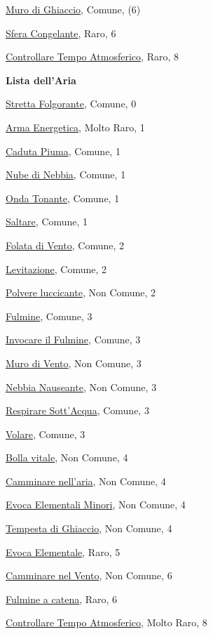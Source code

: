 \begin{multicols}{3}
{{\hyperlink{Muro di Ghiaccio}{Muro di Ghiaccio}, Comune, (6)

\hyperlink{Sfera Congelante}{Sfera Congelante}, Raro, 6

\hyperlink{Controllare Tempo Atmosferico}{Controllare Tempo Atmosferico}, Raro, 8

\medskip\textbf{Lista dell'Aria}

\hyperlink{Stretta Folgorante}{Stretta Folgorante}, Comune, 0

\hyperlink{Arma Energetica}{Arma Energetica}, Molto Raro, 1

\hyperlink{Caduta Piuma}{Caduta Piuma}, Comune, 1

\hyperlink{Nube di Nebbia}{Nube di Nebbia}, Comune, 1

\hyperlink{Onda Tonante}{Onda Tonante}, Comune, 1

\hyperlink{Saltare}{Saltare}, Comune, 1

\hyperlink{Folata di Vento}{Folata di Vento}, Comune, 2

\hyperlink{Levitazione}{Levitazione}, Comune, 2

\hyperlink{Polvere luccicante}{Polvere luccicante}, Non Comune, 2

\hyperlink{Fulmine}{Fulmine}, Comune, 3

\hyperlink{Invocare il Fulmine}{Invocare il Fulmine}, Comune, 3

\hyperlink{Muro di Vento}{Muro di Vento}, Non Comune, 3

\hyperlink{Nebbia Nauseante}{Nebbia Nauseante}, Non Comune, 3

\hyperlink{Respirare Sott'Acqua}{Respirare Sott'Acqua}, Comune, 3

\hyperlink{Volare}{Volare}, Comune, 3

\hyperlink{Bolla vitale}{Bolla vitale}, Non Comune, 4

\hyperlink{Camminare nell'aria}{Camminare nell'aria}, Non Comune, 4

\hyperlink{Evoca Elementali Minori}{Evoca Elementali Minori}, Non Comune, 4

\hyperlink{Tempesta di Ghiaccio}{Tempesta di Ghiaccio}, Non Comune, 4

\hyperlink{Evoca Elementale}{Evoca Elementale}, Raro, 5

\hyperlink{Camminare nel Vento}{Camminare nel Vento}, Non Comune, 6

\hyperlink{Fulmine a catena}{Fulmine a catena}, Raro, 6

\hyperlink{Controllare Tempo Atmosferico}{Controllare Tempo Atmosferico}, Molto Raro, 8

}}
\end{multicols}
